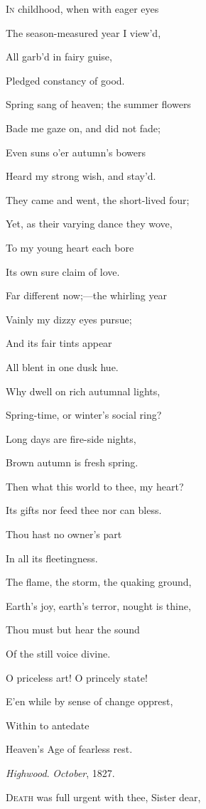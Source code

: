 I\textsc{n} childhood, when with eager eyes

The season-measured year I view'd,

All garb'd in fairy
guise,

Pledged
constancy of good.

Spring sang of heaven; the summer flowers

Bade me gaze on, and did not fade;

Even suns o'er autumn's
bowers

Heard
my strong wish, and stay'd.

They came and went, the short-lived four;

Yet, as their varying dance they wove,

To my young heart each
bore

Its own
sure claim of love. 

Far different now;—the whirling year

Vainly my dizzy eyes pursue;

And its fair tints appear

All
blent in one dusk hue.

Why dwell on rich autumnal lights,

Spring-time, or winter's social ring?

Long days are fire-side
nights,

Brown
autumn is fresh spring.

Then what this world to thee, my heart?

Its gifts nor feed thee nor can bless.

Thou hast no owner's part

In all
its fleetingness.

The flame, the storm, the quaking ground,

Earth's joy, earth's terror, nought is
thine,

Thou must but hear the
sound

Of the
still voice divine.

O priceless art! O princely state!

E'en while by sense of change opprest,

Within to antedate

Heaven's
Age of fearless rest.

\emph{Highwood}.
\emph{October}, 1827.


D\textsc{eath} was full urgent with thee, Sister dear,

